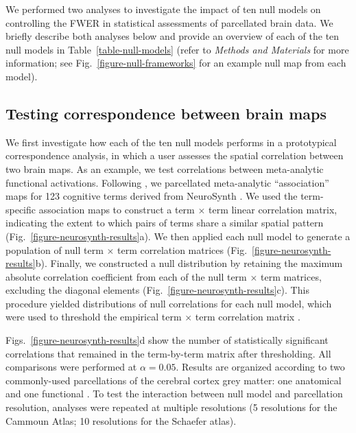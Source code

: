 \documentclass[12pt,aps,pra,reprint,showkeys]{revtex4-1}
\begin{document}
We performed two analyses to investigate the impact of ten null models on controlling the FWER in statistical assessments of parcellated brain data.
We briefly describe both analyses below and provide an overview of each of the ten null models in Table~\ref{table-null-models} (refer to \emph{Methods and Materials} for more information; see Fig.~\ref{figure-null-frameworks} for an example null map from each model).

\subsection*{Testing correspondence between brain maps}

We first investigate how each of the ten null models performs in a prototypical correspondence analysis, in which a user assesses the spatial correlation between two brain maps.
As an example, we test correlations between meta-analytic functional activations.
Following \citet{alexanderbloch2018neuroimage}, we parcellated meta-analytic ``association'' maps for 123 cognitive terms derived from NeuroSynth \citep{yarkoni2011natmethods, poldrack2011frontiers}.
We used the term-specific association maps to construct a term $\times$ term linear correlation matrix, indicating the extent to which pairs of terms share a similar spatial pattern (Fig.~\ref{figure-neurosynth-results}a).
We then applied each null model to generate a population of null term $\times$ term correlation matrices (Fig.~\ref{figure-neurosynth-results}b).
Finally, we constructed a null distribution by retaining the maximum absolute correlation coefficient from each of the null term $\times$ term matrices, excluding the diagonal elements (Fig.~\ref{figure-neurosynth-results}c).
This procedure yielded distributions of null correlations for each null model, which were used to threshold the empirical term $\times$ term correlation matrix \citep{alexanderbloch2018neuroimage}.

Figs.~\ref{figure-neurosynth-results}d show the number of statistically significant correlations that remained in the term-by-term matrix after thresholding.
All comparisons were performed at $\alpha=0.05$.
Results are organized according to two commonly-used parcellations of the cerebral cortex grey matter: one anatomical \citep{desikan2006automated, cammoun2012mapping} and one functional \citep{schaefer2018cercor}.
To test the interaction between null model and parcellation resolution, analyses were repeated at multiple resolutions (5 resolutions for the Cammoun Atlas; 10 resolutions for the Schaefer atlas).
\end{document}
